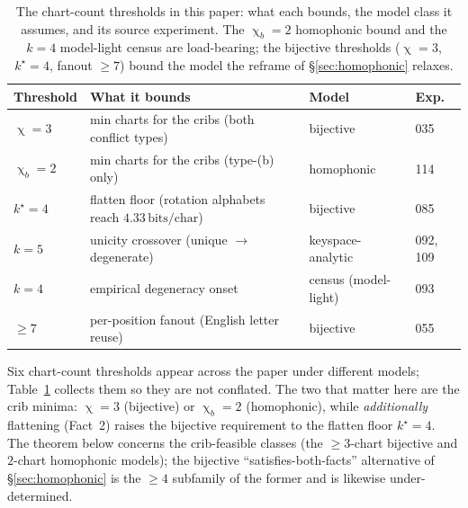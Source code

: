 \documentclass[11pt]{article}
\theoremstyle{plain}
\theoremstyle{definition}
\newcommand{\bits}{\,\text{bits/char}}
\DeclareMathOperator{\chrom}{\chi}
\begin{document}
\begin{table}[t]\centering\small
\begin{tabular}{@{}llll@{}}
\toprule
Threshold & What it bounds & Model & Exp. \\
\midrule
$\chrom=3$ & min charts for the cribs (both conflict types) & bijective & 035 \\
$\chrom_b=2$ & min charts for the cribs (type-(b) only) & homophonic & 114 \\
$k^\star=4$ & flatten floor (rotation alphabets reach $4.33\bits$) & bijective & 085 \\
$k=5$ & unicity crossover (unique $\to$ degenerate) & keyspace-analytic & 092, 109 \\
$k=4$ & empirical degeneracy onset & census (model-light) & 093 \\
$\ge7$ & per-position fanout (English letter reuse) & bijective & 055 \\
\bottomrule
\end{tabular}
\caption{The chart-count thresholds in this paper: what each bounds, the model class
it assumes, and its source experiment. The $\chrom_b=2$ homophonic bound and the
$k=4$ model-light census are load-bearing; the bijective thresholds ($\chrom=3$,
$k^\star=4$, fanout $\ge7$) bound the model the reframe of \S\ref{sec:homophonic}
relaxes.}
\label{tab:thresholds}
\end{table}

Six chart-count thresholds appear across the paper under different models;
Table~\ref{tab:thresholds} collects them so they are not conflated. The two that
matter here are the crib minima: $\chrom=3$ (bijective) or $\chrom_b=2$ (homophonic),
while \emph{additionally} flattening (Fact~2) raises the bijective requirement to the
flatten floor $k^\star=4$. The theorem below concerns the crib-feasible classes (the
$\ge3$-chart bijective and $2$-chart homophonic models); the bijective
``satisfies-both-facts'' alternative of \S\ref{sec:homophonic} is the $\ge4$ subfamily
of the former and is likewise under-determined.
\end{document}
